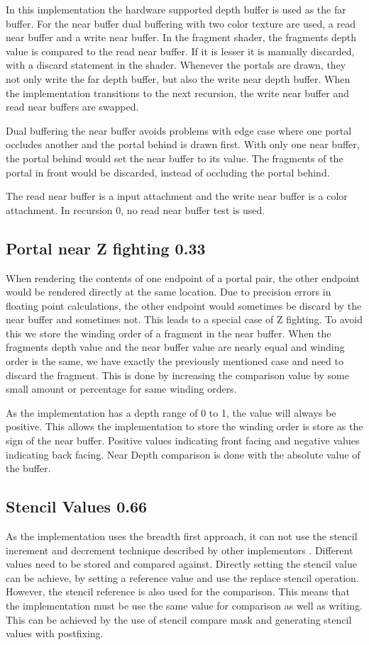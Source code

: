 In this implementation the hardware supported depth buffer is used as the far buffer. For the near buffer dual buffering with two color texture are used, a read near buffer and a write near buffer. In the fragment shader, the fragments depth value is compared to the read near buffer. If it is lesser it is manually discarded, with a discard statement in the shader. Whenever the portals are drawn, they not only write the far depth buffer, but also the write near depth buffer. When the implementation transitions to the next recursion, the write near buffer and read near buffers are swapped.

Dual buffering the near buffer avoids problems with edge case where one portal occludes another and the portal behind is drawn first. With only one near buffer, the portal behind would set the near buffer to its value. The fragments of the portal in front would be discarded, instead of occluding the portal behind.

The read near buffer is a input attachment and the write near buffer is a color attachment. In recursion 0, no read near buffer test is used.

\subsection{Portal near Z fighting 0.33}
When rendering the contents of one endpoint of a portal pair, the other endpoint would be rendered directly at the same location. Due to precision errors in floating point calculations, the other endpoint would sometimes be discard by the near buffer and sometimes not. This leads to a special case of Z fighting. To avoid this we store the winding order of a fragment in the near buffer. When the fragments depth value and the near buffer value are nearly equal and winding order is the same, we have exactly the previously mentioned case and need to discard the fragment. This is done by increasing the comparison value by some small amount or percentage for same winding orders.

As the implementation has a depth range of 0 to 1, the value will always be positive. This allows the implementation to store the winding order is store as the sign of the near buffer. Positive values indicating front facing and negative values indicating back facing. Near Depth comparison is done with the absolute value of the buffer.

\subsection{Stencil Values 0.66}
As the implementation uses the breadth first approach, it can not use the stencil increment and decrement technique described by other implementors \cite{schmalstieg:1999:sewing, lowe:2003:fragment, lecture:portalProblems}. Different values need to be stored and compared against. Directly setting the stencil value can be achieve, by setting a reference value and use the replace stencil operation. However, the stencil reference is also used for the comparison. This means that the implementation must be use the same value for comparison as well as writing. This can be achieved by the use of stencil compare mask and generating stencil values with postfixing.

